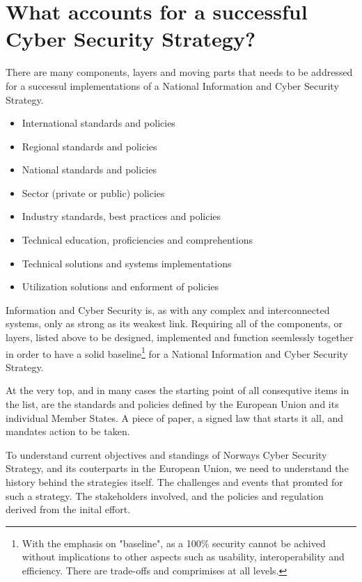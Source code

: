 
\section{What accounts for a successful Cyber Security Strategy?}\label{Sucessful_NCSS}

There are many components, layers and moving parts that needs to be addressed for a successul implementations of a National Information and Cyber Security Strategy.

\begin{itemize}
    \item International standards and policies
    \item Regional standards and policies
    \item National standards and policies
    \item Sector (private or public) policies
    \item Industry standards, best practices and policies
    \item Technical education, proficiencies and comprehentions
    \item Technical solutions and systems implementations
    \item Utilization solutions and enforment of policies
\end{itemize}

Information and Cyber Security is, as with any complex and interconnected systems, only as strong as its weakest link. Requiring all of the components, or layers, listed above to be designed, implemented and function seemlessly together in order to have a solid baseline\footnote[1]{With the emphasis on "baseline", as a 100\% security cannot be achived without implications to other aspects such as usability, interoperability and efficiency. There are trade-offs and comprimises at all levels.} for a National Information and Cyber Security Strategy.

At the very top, and in many cases the starting point of all consequtive items in the list, are the standards and policies defined by the European Union and its individual Member States. A piece of paper, a signed law that starts it all, and mandates action to be taken.

To understand current objectives and standings of Norways Cyber Security Strategy, and its couterparts in the European Union, we need to understand the history behind the strategies itself. The challenges and events that promted for such a strategy. The stakeholders involved, and the policies and regulation derived from the inital effort.

